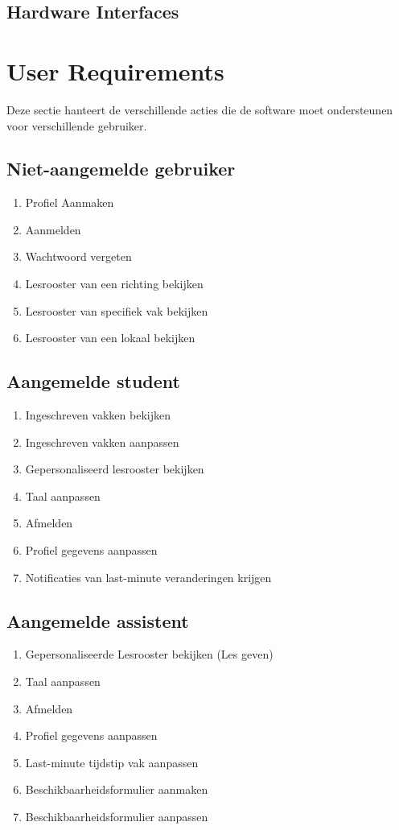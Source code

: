 \subsection{Hardware Interfaces}

\section{User Requirements}
Deze sectie hanteert de verschillende acties die de software moet ondersteunen voor verschillende gebruiker.

\subsection{Niet-aangemelde gebruiker}
\begin{enumerate}
    \item Profiel Aanmaken
    \item Aanmelden
    \item Wachtwoord vergeten
    \item Lesrooster van een richting bekijken
    \item Lesrooster van specifiek vak bekijken
    \item Lesrooster van een lokaal bekijken
\end{enumerate}

\subsection{Aangemelde student}
\begin{enumerate}
    \item Ingeschreven vakken bekijken
    \item Ingeschreven vakken aanpassen
    \item Gepersonaliseerd lesrooster bekijken
    \item Taal aanpassen
    \item Afmelden
    \item Profiel gegevens aanpassen
    \item Notificaties van last-minute veranderingen krijgen
\end{enumerate}

\subsection{Aangemelde assistent}
\begin{enumerate}
    \item Gepersonaliseerde Lesrooster bekijken (Les geven)
    \item Taal aanpassen
    \item Afmelden
    \item Profiel gegevens aanpassen
    \item Last-minute tijdstip vak aanpassen 
    \item Beschikbaarheidsformulier aanmaken
    \item Beschikbaarheidsformulier aanpassen
\end{enumerate}

